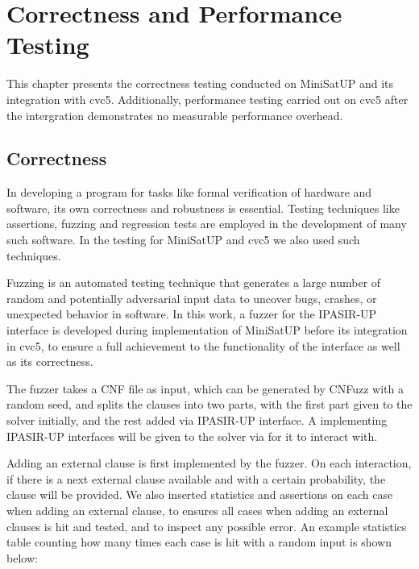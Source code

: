 \chapter{Correctness and Performance Testing}

This chapter presents the correctness testing conducted on MiniSatUP and its integration with cvc5. Additionally, performance testing carried out on cvc5 after the intergration demonstrates no measurable performance overhead.

\section{Correctness}

In developing a program for tasks like formal verification of hardware and software, its own correctness and robustness is essential. Testing techniques like assertions, fuzzing and regression tests are employed in the development of many such software. In the testing for MiniSatUP and cvc5 we also used such techniques.

Fuzzing is an automated testing technique that generates a large number of random and potentially adversarial input data to uncover bugs, crashes, or unexpected behavior in software. In this work, a fuzzer for the IPASIR-UP interface is developed during implementation of MiniSatUP before its integration in cvc5, to ensure a full achievement to the functionality of the interface as well as its correctness.

The fuzzer takes a CNF file as input, which can be generated by CNFuzz \cite{BrummayerLonsingBiere-SAT10} with a random seed, and splits the clauses into two parts, with the first part given to the solver initially, and the rest added via IPASIR-UP interface. A  implementing IPASIR-UP interfaces will be given to the solver via  for it to interact with.

Adding an external clause is first implemented by the fuzzer. On each interaction, if there is a next external clause available and with a certain probability, the clause will be provided. We also inserted statistics and assertions on each case when adding an external clause, to ensures all cases when adding an external clauses is hit and tested, and to inspect any possible error. An example statistics table counting how many times each case is hit with a random input is shown below:


